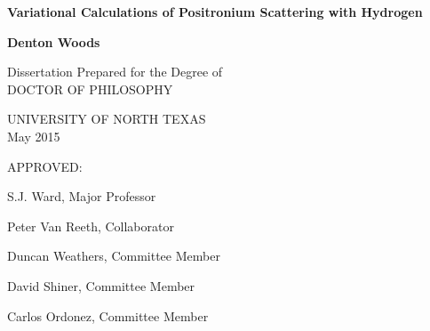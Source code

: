 
\begin{titlepage}
    \begin{center}
        \vspace*{1cm}
        
        \LARGE
        \textbf{Variational Calculations of Positronium Scattering with Hydrogen}
        \vspace{0.5cm}
		
        \Large     
        \textbf{Denton Woods}
        
        \vspace{4cm}
        
		\normalsize
        Dissertation Prepared for the Degree of\\
        DOCTOR OF PHILOSOPHY
        
		\vspace{4cm}
		
        \normalsize
		UNIVERSITY OF NORTH TEXAS\\
		May 2015
    \end{center}

	\vfill
  
	\hspace{8cm} APPROVED:
	\vspace{0.1cm}
	
	\hspace{8cm} S.J. Ward, Major Professor

	\hspace{8cm} Peter Van Reeth, Collaborator

	\hspace{8cm} Duncan Weathers, Committee Member

	\hspace{8cm} David Shiner, Committee Member

	\hspace{8cm} Carlos Ordonez, Committee Member

\end{titlepage}